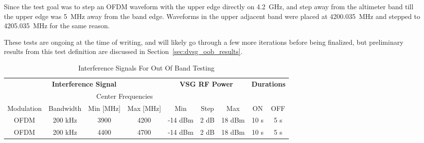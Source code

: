 Since the test goal was to step an OFDM waveform with the upper edge directly on 4.2~GHz, and step away from the altimeter band till the upper edge was 5~MHz away from the band edge. Waveforms in the upper adjacent band were placed at 4200.035~MHz and stepped to 4205.035~MHz for the same reason.

These tests are ongoing at the time of writing, and will likely go through a few more iterations before being finalized, but preliminary results from this test definition are discussed in Section~\ref{sec:dvsg_oob_results}.

\begin{table}[]
\begin{tabular}{cc|cc|ccc|cc}
\multicolumn{4}{c|}{\textbf{Interference Signal}}                                     & \multicolumn{3}{c|}{\textbf{VSG RF Power}} & \multicolumn{2}{c}{\textbf{Durations}} \\
                                &           & \multicolumn{2}{c|}{Center Frequencies} &                &            &              &                               &         \\
\multicolumn{1}{c|}{Modulation} & Bandwidth & Min {[}MHz{]}      & Max {[}MHz{]}      & Min            & Step       & Max          & \multicolumn{1}{c|}{ON}       & OFF     \\ \hline
\multicolumn{1}{c|}{OFDM}       & 200 kHz   & 3900           & 4200         & -14 dBm        & 2 dB       & 18 dBm       & \multicolumn{1}{c|}{10 s}     & 5 s    \\
\multicolumn{1}{c|}{OFDM}       & 200 kHz   & 4400      & 4700 & -14 dBm        & 2 dB       & 18 dBm       & \multicolumn{1}{c|}{10 s}     & 5 s   
\end{tabular}
\caption{Interference Signals For Out Of Band Testing}
\label{tab:oob}
\end{table}
